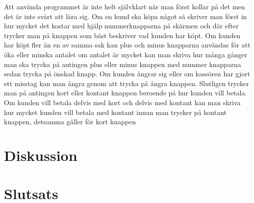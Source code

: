 \documentclass[a4paper, 12pt]{article}
\begin{document}
Att använda programmet är inte helt självklart när man först kollar på det men det är inte svårt att lära sig.
Om en kund ska köpa något så skriver man först in hur mycket det kostar med hjälp nummerknapparna på skärmen och där efter trycker man på knappen som bäst beskriver vad kunden har köpt.
Om kunden har köpt fler än en av samma sak kan plus och minus knapparna användas för att öka eller minska antalet om antalet är mycket kan man skriva hur många gånger man ska trycka på antingen plus eller minus knappen med nummer knapparna sedan trycka på önskad knapp.
 Om kunden ångrar sig eller om kassören har gjort ett misstag kan man ångra genom att trycka på ångra knappen.
 Slutligen trycker man på antingen kort eller kontant knappen beroende på hur kunden vill betala. Om kunden vill betala delvis med kort och delvis med kontant kan man skriva hur mycket kunden vill betala med kontant innan man trycker på kontant knappen, detsamma gäller för kort knappen


\section{Diskussion}


\section{Slutsats}

\newpage 

%

\printbibliography
\end{document}
